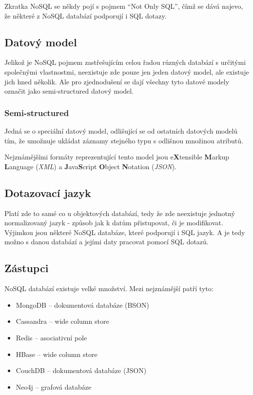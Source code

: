 Zkratka NoSQL se někdy pojí s pojmem "`Not Only SQL"', čímž se dává najevo, že některé z NoSQL databází podporují i SQL dotazy.

\subsection{Datový model}
Jelikož je NoSQL pojmem zastřešujícím celou řadou různých databází s určitými společnými vlastnostmi, neexistuje zde pouze jen jeden datový model, ale existuje jich hned několik. Ale pro zjednodušení se dají všechny tyto datové modely označit jako semi-structured datový model.
\subsubsection{Semi-structured}
Jedná se o speciální datový model, odlišující se od ostatních datových modelů tím, že umožnuje ukládat záznamy stejného typu s odlišnou množinou atributů.

Nejznámějšími formáty reprezentující tento model jsou e\textbf{X}tensible \textbf{M}arkup \textbf{L}anguage (\emph{XML}) a \textbf{J}ava\textbf{S}cript \textbf{O}bject \textbf{N}otation (\emph{JSON}).

\subsection{Dotazovací jazyk}
Platí zde to samé co u objektových databází, tedy že zde neexistuje jednotný normalizovaný jazyk - způsob jak k datům přistupovat, či je modifikovat. Výjimkou jsou některé NoSQL databáze, které podporují i SQL jazyk. A je tedy možno s danou databází a jejími daty pracovat pomocí SQL dotazů.

\subsection{Zástupci}
NoSQL databází existuje velké množství. Mezi nejznámější patří tyto:
\begin{itemize}
  \item MongoDB -- dokumentová databáze (BSON)
  \item Cassandra -- wide column store 
  \item Redis -- asociativní pole
  \item HBase -- wide column store 
  \item CouchDB -- dokumentová databáze (JSON)
  \item Neo4j -- grafová databáze
\end{itemize}
